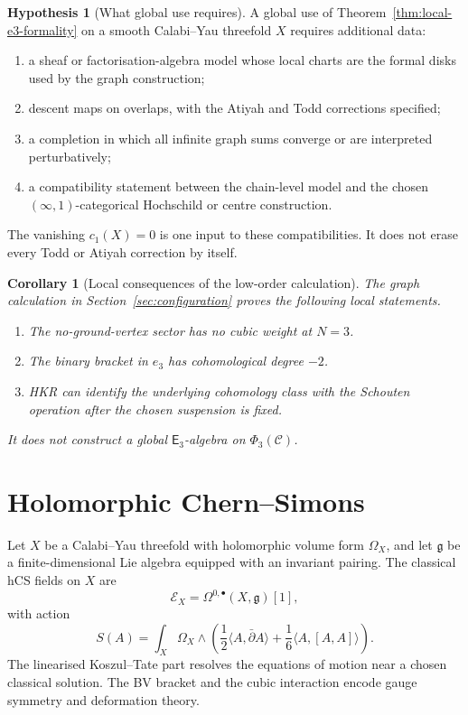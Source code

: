 \documentclass[11pt]{amsart}
\newtheorem{corollary}[theorem]{Corollary}
\theoremstyle{definition}
\newtheorem{hypothesis}[theorem]{Hypothesis}
\theoremstyle{remark}
\providecommand{\Ethree}{\mathsf{E}_3}
\providecommand{\cC}{\mathcal{C}}
\providecommand{\cE}{\mathcal{E}}
\begin{document}
\begin{hypothesis}[What global use requires]
\label{hyp:global-formality}
A global use of Theorem~\ref{thm:local-e3-formality} on a smooth
Calabi--Yau threefold \(X\) requires additional data:
\begin{enumerate}
\item a sheaf or factorisation-algebra model whose local charts are the
formal disks used by the graph construction;
\item descent maps on overlaps, with the Atiyah and Todd corrections
specified;
\item a completion in which all infinite graph sums converge or are
interpreted perturbatively;
\item a compatibility statement between the chain-level model and the
chosen \((\infty,1)\)-categorical Hochschild or centre construction.
\end{enumerate}
The vanishing \(c_1(X)=0\) is one input to these compatibilities.  It
does not erase every Todd or Atiyah correction by itself.
\end{hypothesis}

\begin{corollary}[Local consequences of the low-order calculation]
\label{cor:local-consequences}
The graph calculation in Section~\ref{sec:configuration} proves the
following local statements.
\begin{enumerate}
\item The no-ground-vertex sector has no cubic weight at \(N=3\).
\item The binary bracket in \(e_3\) has cohomological degree \(-2\).
\item HKR can identify the underlying cohomology class with the
Schouten operation after the chosen suspension is fixed.
\end{enumerate}
It does not construct a global \(\Ethree\)-algebra on
\(\Phi_3(\cC)\).
\end{corollary}

\section{Holomorphic Chern--Simons}
\label{sec:hcs}

Let \(X\) be a Calabi--Yau threefold with holomorphic volume form
\(\Omega_X\), and let \(\mathfrak g\) be a finite-dimensional Lie
algebra equipped with an invariant pairing.  The classical hCS fields
on \(X\) are
\[
  \cE_X=\Omega^{0,\bullet}(X,\mathfrak g)[1],
\]
with action
\[
  S(A)=\int_X \Omega_X\wedge
  \left(\frac12\langle A,\bar\partial A\rangle
  +\frac16\langle A,[A,A]\rangle\right).
\]
The linearised Koszul--Tate part resolves the equations of motion near
a chosen classical solution.  The BV bracket and the cubic interaction
encode gauge symmetry and deformation theory.
\end{document}
